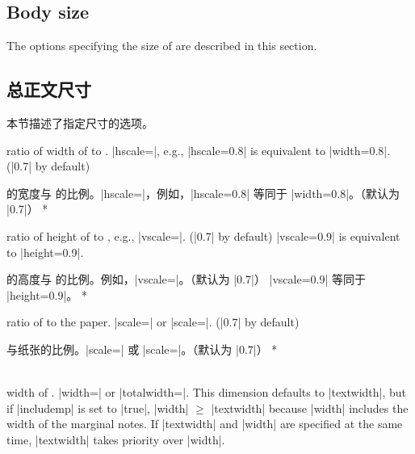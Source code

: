 \begin{paracol}{2}
\subsection{Body size}\label{sec:body}

The options specifying the size of  are described in this
section.
\switchcolumn
\subsection{总正文尺寸}
本节描述了指定尺寸的选项。
\end{paracol}

\begin{Options}
\begin{paracol}{2}
\item[hscale]
ratio of width of  to . 
|hscale=|, e.g., |hscale=0.8| is equivalent to
|width=0.8|. (|0.7| by default)
\switchcolumn
\item[hscale] 的宽度与  的比例。|hscale=|，例如，|hscale=0.8| 等同于 |width=0.8|。（默认为 |0.7|）   
   \switchcolumn[0]*   
\item[vscale]
   ratio of height of  to , e.g.,
   |vscale=|. (|0.7| by default) |vscale=0.9| is equivalent
   to |height=0.9|.
\switchcolumn
\item[vscale] 的高度与  的比例。例如，|vscale=|。（默认为 |0.7|）
|vscale=0.9| 等同于 |height=0.9|。
\switchcolumn[0]*
\item[scale] ratio of  to the paper.
   |scale=| or |scale=|.
   (|0.7| by default)
\switchcolumn
\item[scale] 与纸张的比例。|scale=| 或 |scale=|。（默认为 |0.7|）
\switchcolumn[0]*
\item[width\OR totalwidth] ~\\
width of . |width=| or
|totalwidth=|. This dimension defaults to |textwidth|,
but if |includemp| is set to |true|, |width| $\ge$ |textwidth| 
because |width| includes the width of the marginal notes.
If |textwidth| and |width| are specified at the same time, 
|textwidth| takes priority over |width|.

\end{paracol}
\end{Options}
